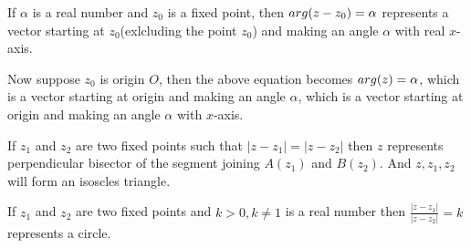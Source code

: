   If $\alpha$ is a real number and $z_0$ is a fixed point, then $\\arg(z - z_0) =\alpha$ represents a vector starting at
  $z_0$(exlcluding  the point $z_0$) and making an angle $\alpha$ with real $x$-axis.

  \startplacefigure
  \stopplacefigure

  Now suppose $z_0$ is origin $O$, then the above equation becomes $\\arg(z) = \alpha$, which is a vector starting at origin and
  making an angle $\alpha$, which is a vector starting at origin and making an angle $\alpha$ with $x$-axis.
\item If $z_1$ and $z_2$ are two fixed points such that $|z - z_1| = |z - z_2|$ then $z$ represents perpendicular bisector of the
  segment joining $A(z_1)$ and $B(z_2).$ And $z, z_1, z_2$ will form an isoscles triangle.
  \startplacefigure
  \stopplacefigure

  If $z_1$ and $z_2$ are two fixed points and $k > 0, k\neq 1$ is a real number then $\frac{|z- z_1|}{|z - z_2|} = k$ represents a
  circle.

